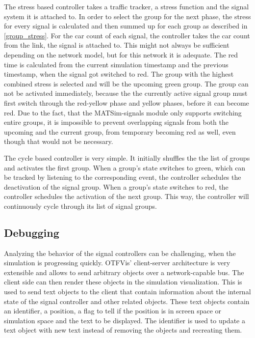 The stress based controller takes a traffic tracker, a stress function and the signal system it is attached to. In order to select the group for the next phase, the stress for every signal is calculated and then summed up for each group as described in \autoref{group_stress}. For the car count of each signal, the controller takes the car count from the link, the signal is attached to. This might not always be sufficient depending on the network model, but for this network it is adequate. The red time is calculated from the current simulation timestamp and the previous timestamp, when the signal got switched to red. The group with the highest combined stress is selected and will be the upcoming green group. The group can not be activated immediately, because the the currently active signal group must first switch through the red-yellow phase and yellow phases, before it can become red. Due to the fact, that the MATSim-signals module only supports switching entire groups, it is impossible to prevent overlapping signals from both the upcoming and the current group, from temporary becoming red as well, even though that would not be necessary.

The cycle based controller is very simple. It initially shuffles the the list of groups and activates the first group. When a group's state switches to green, which can be tracked by listening to the corresponding event, the controller schedules the deactivation of the signal group. When a group's state switches to red, the controller schedules the activation of the next group. This way, the controller will continuously cycle through its list of signal groups.

\subsection*{Debugging}

Analyzing the behavior of the signal controllers can be challenging, when the simulation is progressing quickly. OTFVis' client-server architecture is very extensible and allows to send arbitrary objects over a network-capable bus. The client side can then render these objects in the simulation visualization. This is used to send text objects to the client that contain information about the internal state of the signal controller and other related objects. These text objects contain an identifier, a position, a flag to tell if the position is in screen space or simulation space and the text to be displayed. The identifier is used to update a text object with new text instead of removing the objects and recreating them.

